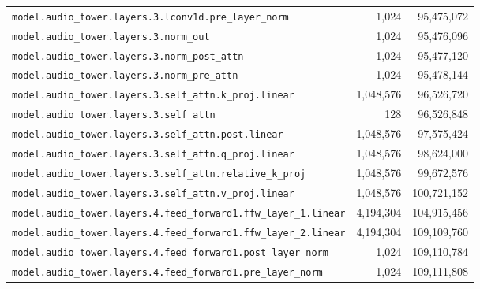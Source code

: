 \documentclass[10pt,a4paper]{article}
\theoremstyle{definition}
\begin{document}
\begin{appendices}
\begin{longtable}{p{9.5cm}rr}
\texttt{model.\allowbreak{}audio\_tower.\allowbreak{}layers.\allowbreak{}3.\allowbreak{}lconv1d.\allowbreak{}pre\_layer\_norm} & 1,024 & 95,475,072 \\
\texttt{model.\allowbreak{}audio\_tower.\allowbreak{}layers.\allowbreak{}3.\allowbreak{}norm\_out} & 1,024 & 95,476,096 \\
\texttt{model.\allowbreak{}audio\_tower.\allowbreak{}layers.\allowbreak{}3.\allowbreak{}norm\_post\_attn} & 1,024 & 95,477,120 \\
\texttt{model.\allowbreak{}audio\_tower.\allowbreak{}layers.\allowbreak{}3.\allowbreak{}norm\_pre\_attn} & 1,024 & 95,478,144 \\
\texttt{model.\allowbreak{}audio\_tower.\allowbreak{}layers.\allowbreak{}3.\allowbreak{}self\_attn.\allowbreak{}k\_proj.\allowbreak{}linear} & 1,048,576 & 96,526,720 \\
\texttt{model.\allowbreak{}audio\_tower.\allowbreak{}layers.\allowbreak{}3.\allowbreak{}self\_attn} & 128 & 96,526,848 \\
\texttt{model.\allowbreak{}audio\_tower.\allowbreak{}layers.\allowbreak{}3.\allowbreak{}self\_attn.\allowbreak{}post.\allowbreak{}linear} & 1,048,576 & 97,575,424 \\
\texttt{model.\allowbreak{}audio\_tower.\allowbreak{}layers.\allowbreak{}3.\allowbreak{}self\_attn.\allowbreak{}q\_proj.\allowbreak{}linear} & 1,048,576 & 98,624,000 \\
\texttt{model.\allowbreak{}audio\_tower.\allowbreak{}layers.\allowbreak{}3.\allowbreak{}self\_attn.\allowbreak{}relative\_k\_proj} & 1,048,576 & 99,672,576 \\
\texttt{model.\allowbreak{}audio\_tower.\allowbreak{}layers.\allowbreak{}3.\allowbreak{}self\_attn.\allowbreak{}v\_proj.\allowbreak{}linear} & 1,048,576 & 100,721,152 \\
\texttt{model.\allowbreak{}audio\_tower.\allowbreak{}layers.\allowbreak{}4.\allowbreak{}feed\_forward1.\allowbreak{}ffw\_layer\_1.\allowbreak{}linear} & 4,194,304 & 104,915,456 \\
\texttt{model.\allowbreak{}audio\_tower.\allowbreak{}layers.\allowbreak{}4.\allowbreak{}feed\_forward1.\allowbreak{}ffw\_layer\_2.\allowbreak{}linear} & 4,194,304 & 109,109,760 \\
\texttt{model.\allowbreak{}audio\_tower.\allowbreak{}layers.\allowbreak{}4.\allowbreak{}feed\_forward1.\allowbreak{}post\_layer\_norm} & 1,024 & 109,110,784 \\
\texttt{model.\allowbreak{}audio\_tower.\allowbreak{}layers.\allowbreak{}4.\allowbreak{}feed\_forward1.\allowbreak{}pre\_layer\_norm} & 1,024 & 109,111,808 \\

\end{longtable}
\end{appendices}
\end{document}
